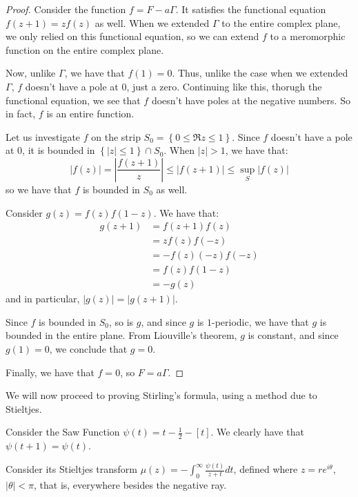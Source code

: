 \documentclass[11pt]{article} %
\theoremstyle{definition}
\theoremstyle{remark}
\newcommand{\abs}[1]{\left|#1\right|}
\begin{document}
\begin{proof}
Consider the function $f = F - a\Gamma$. It satisfies the functional equation $f\left(z+1\right) = zf\left(z\right)$ as well. When we extended $\Gamma$ to the entire complex plane, we only relied on this functional equation, so we can extend $f$ to a meromorphic function on the entire complex plane.

Now, unlike $\Gamma$, we have that $f\left(1\right) = 0$. Thus, unlike the case when we extended $\Gamma$, $f$ doesn't have a pole at $0$, just a zero. Continuing like this, thorugh the functional equation, we see that $f$ doesn't have poles at the negative numbers. So in fact, $f$ is an entire function.

Let us investigate $f$ on the strip $S_0 = \left\{0 \leq \Re z \leq 1\right\}$. Since $f$ doesn't have a pole at $0$, it is bounded in $\left\{\abs{z} \leq 1\right\} \cap S_0$. When $\abs{z} > 1$, we have that:
\[ \abs{f\left(z\right)} = \abs{\frac{f\left(z+1\right)}{z}} \leq \abs{f\left(z+1\right)} \leq \sup_S\abs{f\left(z\right)} \]
so we have that $f$ is bounded in $S_0$ as well.

Consider $g\left(z\right) = f\left(z\right)f\left(1-z\right)$. We have that:
\[
\begin{split}
g\left(z+1\right) & = f\left(z+1\right)f\left(z\right) \\
& = z f\left(z\right)f\left(-z\right) \\
& =-f\left(z\right)\left(-z\right)f\left(-z\right) \\
& = f\left(z\right)f\left(1-z\right) \\
& = -g\left(z\right)
\end{split}
\]
and in particular, $\abs{g\left(z\right)} = \abs{g\left(z+1\right)}$.

Since $f$ is bounded in $S_0$, so is $g$, and since $g$ is $1$-periodic, we have that $g$ is bounded in the entire plane. From Liouville's theorem, $g$ is constant, and since $g\left(1\right) =0$, we conclude that $g = 0$.

Finally, we have that $f = 0$, so $F = a\Gamma$.
\end{proof}

We will now proceed to proving Stirling's formula, using a method due to Stieltjes.

Consider the Saw Function $\psi\left(t\right) = t -\frac{1}{2} - \left[t\right]$. We clearly have that $\psi\left(t + 1\right) = \psi\left(t\right)$.

Consider its Stieltjes transform $\mu\left(z\right) = - \int_0^\infty \frac{\psi\left(t\right)}{z + t}dt$, defined where $z = re^{i\theta}$, $\abs{\theta} < \pi$, that is, everywhere besides the negative ray.
\end{document}
